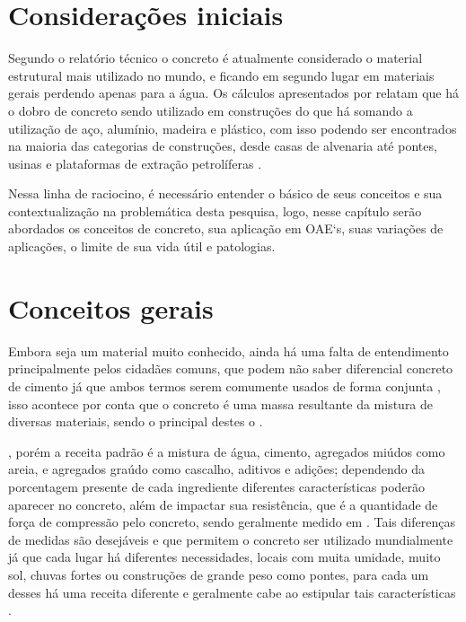 \section{Considerações iniciais}

Segundo o relatório técnico  o concreto é atualmente considerado o material estrutural mais utilizado no mundo, e ficando em segundo lugar em materiais gerais perdendo apenas para a água. 
Os cálculos apresentados por  relatam que há o dobro de concreto sendo utilizado em construções do que há somando a utilização de aço, alumínio, madeira e plástico, com isso podendo ser encontrados na maioria das categorias de construções, desde casas de alvenaria até pontes, usinas e plataformas de extração petrolíferas \cite{Lima2014}.

Nessa linha de raciocino, é necessário entender o básico de seus conceitos e sua contextualização na problemática desta pesquisa, logo, nesse capítulo serão abordados os conceitos de concreto, sua aplicação em OAE`s, suas variações de aplicações, o limite de sua vida útil e patologias.

\section{Conceitos gerais}

Embora seja um material muito conhecido, ainda há uma falta de entendimento principalmente pelos cidadães comuns, que podem não saber diferencial concreto de cimento já que ambos termos serem comumente usados de forma conjunta \cite{Gagg2014}, 
isso acontece por conta que o concreto é uma massa resultante da mistura de diversas materiais, sendo o principal destes o  \cite{allen2019fundamentals}.

, porém a receita padrão é a mistura de água, cimento, agregados miúdos como areia, e agregados graúdo como cascalho, aditivos e adições; dependendo da porcentagem presente de cada ingrediente diferentes características poderão aparecer no concreto, além de impactar sua resistência, que é a quantidade de força de compressão  pelo concreto, sendo geralmente medido em  \cite{pinheiro2007fundamentos}. 
Tais diferenças de medidas são desejáveis e que permitem o concreto ser utilizado mundialmente já que cada lugar há diferentes necessidades, locais com muita umidade, muito sol, chuvas fortes ou construções de grande peso como pontes, para cada um desses há uma receita diferente e geralmente cabe ao  estipular tais características  \cite{izharcomparison}.

